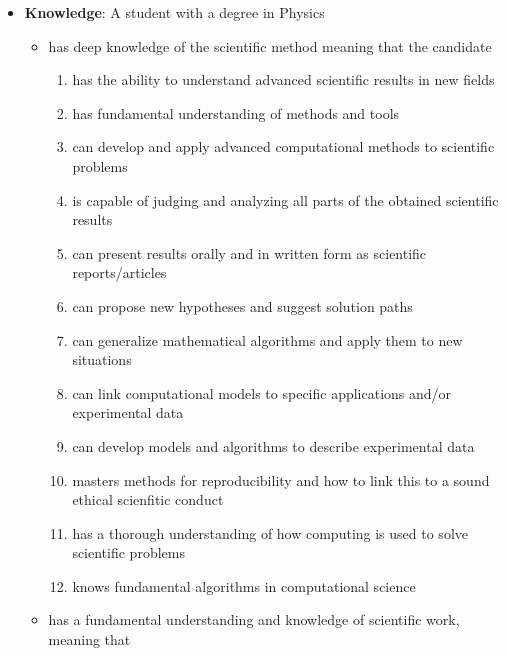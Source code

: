 \documentclass[%
oneside,                 %
final,                   %
10pt]{article}
\begin{document}
\begin{itemize}
\item \textbf{Knowledge}: A student with a degree in Physics
\begin{itemize}

 \item has deep knowledge of the scientific method meaning that the candidate
\begin{enumerate}

 \item has the ability to understand advanced scientific results in new fields

 \item has fundamental understanding of methods and tools

 \item can develop and apply advanced computational methods to scientific problems

 \item is capable of judging and analyzing all parts of the obtained scientific results

 \item can present results orally and in written form as scientific reports/articles

 \item can propose new hypotheses and suggest solution paths

 \item can generalize mathematical algorithms and apply them to new situations

 \item can link computational models to specific applications and/or experimental data

 \item can develop models and algorithms to describe experimental data

\item masters methods for reproducibility and how to link this to a sound ethical scienfitic conduct

\item has a thorough understanding of how computing is used to  solve  scientific problems

\item knows fundamental algorithms in computational science

\end{enumerate}

\noindent
 \item has a fundamental understanding and knowledge of scientific work, meaning that
\begin{enumerate}


\end{enumerate}
\end{itemize}
\end{itemize}
\end{document}
